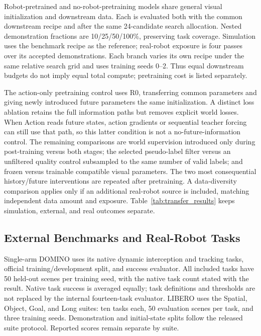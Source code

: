 Robot-pretrained and no-robot-pretraining models share general visual
initialization and downstream data. Each is evaluated both with the common
downstream recipe and after the same 24-candidate search allocation.
Nested demonstration fractions are 10/25/50/100\%, preserving task coverage.
Simulation uses the benchmark recipe as the reference; real-robot exposure
is four passes over its accepted demonstrations. Each branch varies its
own recipe under the same relative search grid and uses training seeds
0--2. Thus equal downstream budgets do not imply equal total compute;
pretraining cost is listed separately.

The action-only pretraining control uses R0, transferring common parameters
and giving newly introduced future parameters the same initialization.
A distinct loss ablation retains the full information paths but removes
explicit world losses. When Action reads future states, action gradients
or sequential teacher forcing can still use that path, so this latter
condition is not a no-future-information control. The remaining comparisons
are world supervision introduced only during post-training versus both
stages; the selected pseudo-label filter versus an unfiltered
quality control subsampled to the same number of valid labels; and
frozen versus trainable compatible visual parameters. The two most
consequential history/future interventions are repeated after pretraining.
A data-diversity comparison applies only if an additional real-robot
source is included, matching independent data amount and exposure.
Table~\ref{tab:transfer_results} keeps simulation, external, and real
outcomes separate.



\subsection{External Benchmarks and Real-Robot Tasks}
Single-arm DOMINO \cite{domino} uses its native dynamic interception and
tracking tasks, official training/development split, and success evaluator.
All included tasks have 50 held-out scenes per training seed, with the
native task count stated with the result. Native task success is averaged
equally; task definitions and thresholds are not replaced by the internal
fourteen-task evaluator. LIBERO \cite{libero} uses the Spatial, Object,
Goal, and Long suites: ten tasks each, 50 evaluation scenes per task, and
three training seeds. Demonstration and initial-state splits follow the
released suite protocol. Reported scores remain separate by suite.

